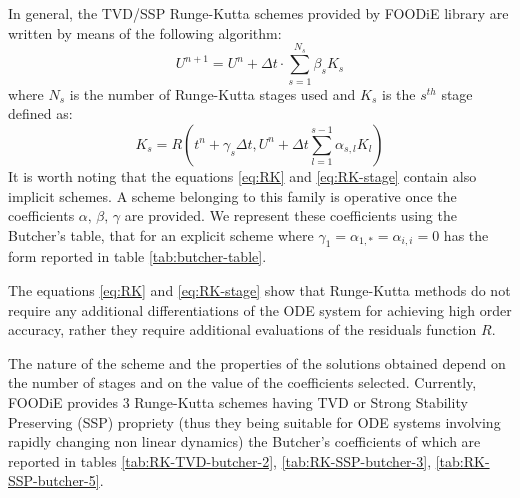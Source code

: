 \documentclass[pdftex,preprint,3p,times,numbers]{elsarticle}
\begin{document}
In general, the TVD/SSP Runge-Kutta schemes provided by FOODiE library are written by means of the following algorithm:
\begin{equation}
  U^{n+1} = U^{n} + \Delta t \cdot\sum\limits_{s=1}^{N_{s}}{\beta_s K_s}
\label{eq:RK}
\end{equation}
where $N_s$ is the number of Runge-Kutta stages used and $K_s$ is the $s^{th}$ stage defined as:
\begin{equation}
  K_s = R\left(t^n + \gamma_s \Delta t, U^n+\Delta t\sum\limits_{l=1}^{s-1}{\alpha_{s,l} K_l} \right)
\label{eq:RK-stage}
\end{equation}
It is worth noting that the equations \ref{eq:RK} and \ref{eq:RK-stage} contain also implicit schemes. A scheme belonging to this family is operative once the coefficients $\alpha,\, \beta,\, \gamma$ are provided. We represent these coefficients using the Butcher's table, that for an explicit scheme where $\gamma_1=\alpha_{1,*}=\alpha_{i,i}=0$ has the form reported in table \ref{tab:butcher-table}.

\begin{table}[!ht]
\caption{Butcher's table for explicit Runge-Kutta schemes}\label{tab:butcher-table}
\centering
{}
\end{table}

The equations \ref{eq:RK} and \ref{eq:RK-stage} show that Runge-Kutta methods do not require any additional differentiations of the ODE system for achieving high order accuracy, rather they require additional evaluations of the residuals function $R$.

The nature of the scheme and the properties of the solutions obtained depend on the number of stages and on the value of the coefficients selected. Currently, FOODiE provides 3 Runge-Kutta schemes having TVD or Strong Stability Preserving (SSP) propriety (thus they being suitable for ODE systems involving rapidly changing non linear dynamics) the Butcher's coefficients of which are reported in tables \ref{tab:RK-TVD-butcher-2}, \ref{tab:RK-SSP-butcher-3}, \ref{tab:RK-SSP-butcher-5}.
\end{document}
